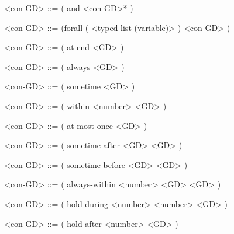 \documentclass[]{article}
\begin{document}
\begin{grammar}
    <con-GD> ::= ( and <con-GD>* )

    <con-GD> ::= (forall ( <typed list (variable)> ) <con-GD> )

    <con-GD> ::= ( at end <GD> )

    <con-GD> ::= ( always <GD> )

    <con-GD> ::= ( sometime <GD> )

    <con-GD> ::= ( within <number> <GD> )

    <con-GD> ::= ( at-most-once <GD> )

    <con-GD> ::= ( sometime-after <GD> <GD> )

    <con-GD> ::= ( sometime-before <GD> <GD> )

    <con-GD> ::= ( always-within <number> <GD> <GD> )

    <con-GD> ::= ( hold-during <number> <number> <GD> )

    <con-GD> ::= ( hold-after <number> <GD> )
\end{grammar}

\nocite{mcdermott-et-al-1998}



\end{document}
